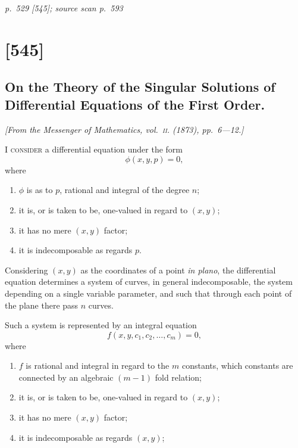\documentclass[11pt,a4paper]{article}
\newcommand{\sourcepage}[3]{%
  \bigskip
  \noindent\textit{p.~#1 [#2]; source scan p.~#3}%
  \par\smallskip
}
\begin{document}
\sourcepage{529}{545}{593}
\section{[545]}
\subsection{On the Theory of the Singular Solutions of Differential Equations of the First Order.}

\begin{center}
\textit{[From the Messenger of Mathematics, vol.~\textsc{ii}. (1873), pp.~6---12.]}
\end{center}

\textsc{I consider} a differential equation under the form
\[
\phi(x,y,p)=0,
\]
where

\begin{enumerate}
\item[$1^\circ$.] $\phi$ is as to $p$, rational and integral of the degree $n$;
\item[$2^\circ$.] it is, or is taken to be, one-valued in regard to $(x,y)$;
\item[$3^\circ$.] it has no mere $(x,y)$ factor;
\item[$4^\circ$.] it is indecomposable as regards $p$.
\end{enumerate}

Considering $(x,y)$ as the coordinates of a point \textit{in plano}, the differential equation
determines a system of curves, in general indecomposable, the system depending on
a single variable parameter, and such that through each point of the plane there pass
$n$ curves.

Such a system is represented by an integral equation
\[
f(x,y,c_1,c_2,\ldots,c_m)=0,
\]
where

\begin{enumerate}
\item[$5^\circ$.] $f$ is rational and integral in regard to the $m$ constants, which constants are
connected by an algebraic $(m-1)$ fold relation;
\item[$6^\circ$.] it is, or is taken to be, one-valued in regard to $(x,y)$;
\item[$7^\circ$.] it has no mere $(x,y)$ factor;
\item[$8^\circ$.] it is indecomposable as regards $(x,y)$;
\end{enumerate}
\end{document}
